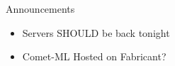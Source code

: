

\begin{frame}{Announcements}
    \begin{itemize}
        \item Servers SHOULD be back tonight
        \item Comet-ML Hosted on Fabricant?
    \end{itemize}
\end{frame}

